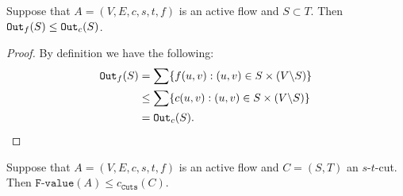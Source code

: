 \documentclass{article}
\begin{document}
\begin{lemma}\label{bounded_by_pipes}
    Suppose that $A=(V, E, c, s, t, f)$ is an active flow and $S \subset T$. Then $\texttt{Out}_f(S) \leq \texttt{Out}_c(S)$.
\end{lemma}
\begin{proof}
    By definition we have the following:
    \begin{align*}
        \texttt{Out}_f(S) &= \sum \{f(u, v) : (u, v) \in S \times (V \backslash S)\}\\
        &\leq \sum \{c(u, v) : (u, v) \in S \times (V \backslash S)\}\\
        &= \texttt{Out}_c(S).
    \end{align*}
\end{proof}

\begin{lemma}\label{flows<=cuts}
    Suppose that $A=(V, E, c, s, t, f)$ is an active flow and $C=(S, T)$ an $s$-$t$-cut. Then $\texttt{F-value}(A) \leq c_{\texttt{Cuts}}(C)$.
\end{lemma}
\end{document}
